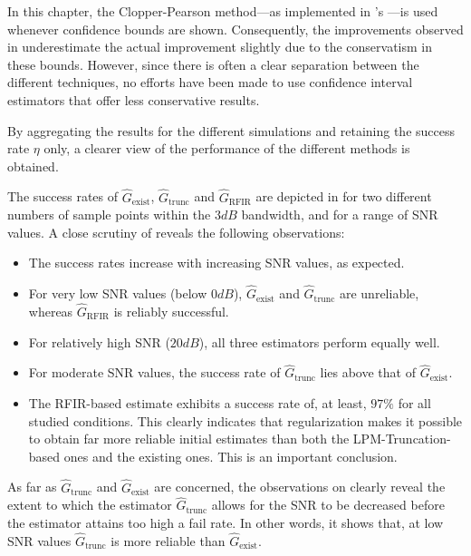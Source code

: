 In this chapter, the Clopper-Pearson method---as implemented in \MATLAB's ---is used whenever confidence bounds are shown.
Consequently, the improvements observed in  underestimate the actual improvement slightly due to the conservatism in these bounds.
However, since there is often a clear separation between the different techniques, no efforts have been made to use confidence interval estimators that offer less conservative results.

By aggregating the results for the different simulations and retaining the success rate $\eta$ only, a clearer view of the performance of the different methods is obtained.

The success rates of $\hat G_\mathrm{exist}$, $\hat G_\mathrm{trunc}$ and $\hat G_\mathrm{RFIR}$ are depicted in   for two different numbers of sample points within the $3\unit{dB}$ bandwidth, and for a range of SNR values. A close scrutiny of   reveals the following observations: \begin{itemize}
\item The success rates increase with increasing SNR values, as expected.
\item For very low SNR values (below $0\unit{dB}$), $\hat G_\mathrm{exist}$ and $\hat G_\mathrm{trunc}$ are unreliable, whereas $\hat G_\mathrm{RFIR}$ is reliably successful. 
\item For relatively high SNR ($20\unit{dB}$), all three estimators perform equally well.
\item For moderate SNR values, the success rate of $\hat G_\mathrm{trunc}$ lies above that of $\hat G_\mathrm{exist}$.
\item The RFIR-based estimate exhibits a success rate of, at least, $97\%$ for all studied conditions. 
This clearly indicates that regularization makes it possible to obtain far more reliable initial estimates than both the LPM-Truncation-based ones and the existing ones. 
This is an important conclusion.
\end{itemize}

As far as $\hat G_\mathrm{trunc}$ and $\hat G_\mathrm{exist}$ are concerned, the observations on  clearly reveal the extent to which the estimator $\hat G_\mathrm{trunc}$ allows for the SNR to be decreased before the estimator attains too high a fail rate. 
In other words, it shows that, at low SNR values $\hat G_\mathrm{trunc}$ is more reliable than $\hat G_\mathrm{exist}$. 

